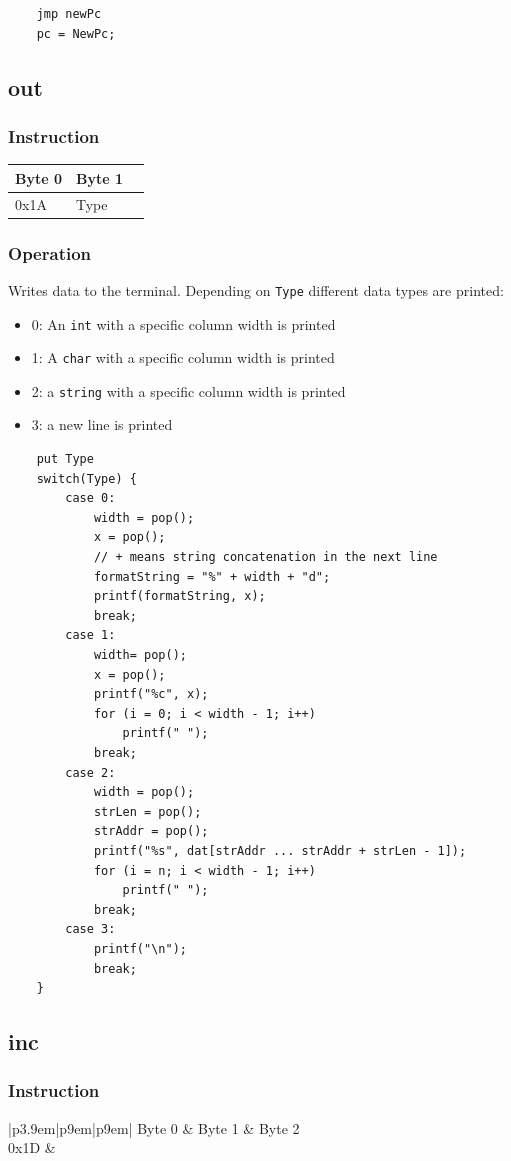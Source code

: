 \documentclass[11pt]{report}
\newcommand{\twobyteinstruction}[2]{
\begin{tabular}{|p{3.9em}|p{9em}|p{9em}|}
\hline
\tiny{Byte 0} & \tiny{Byte 1} \\ \hline
#1 & #2 \\ \hline
\end{tabular}
}
\newcommand{\threebyteinstruction}[2]{
\begin{tabular}{|p{3.9em}|p{9em}|p{9em}|}
\hline
\tiny{Byte 0} & \tiny{Byte 1} & \tiny{Byte 2} \\ \hline
#1 & \multicolumn{2}{c |}{#2} \\ \hline
\end{tabular}
}
\begin{document}
	\begin{lstlisting}
	jmp newPc
	pc = NewPc;
	\end{lstlisting}

\subsection{out}
\subsubsection{Instruction}
\twobyteinstruction{0x1A}{Type}

\subsubsection{Operation}
Writes data to the terminal. Depending on \lstinline$Type$ different data types are printed:

\begin{itemize}
	\item 0: An \lstinline$int$ with a specific column width is printed
	\item 1: A \lstinline$char$ with a specific column width is printed
	\item 2: a \lstinline$string$ with a specific column width is printed
	\item 3: a new line is printed
\end{itemize}

	\begin{lstlisting}
	put Type
	switch(Type) {
		case 0:
			width = pop();
			x = pop();
			// + means string concatenation in the next line
			formatString = "%" + width + "d";
			printf(formatString, x);
			break;
		case 1:
			width= pop();
			x = pop();
			printf("%c", x);
			for (i = 0; i < width - 1; i++)
				printf(" ");
			break;
		case 2:
			width = pop();
			strLen = pop();
			strAddr = pop();
			printf("%s", dat[strAddr ... strAddr + strLen - 1]);
			for (i = n; i < width - 1; i++)
				printf(" ");
			break;
		case 3:
			printf("\n");
			break;
	}
	\end{lstlisting}

\subsection{inc}
\subsubsection{Instruction}
\threebyteinstruction{0x1D}{Size}
\end{document}
